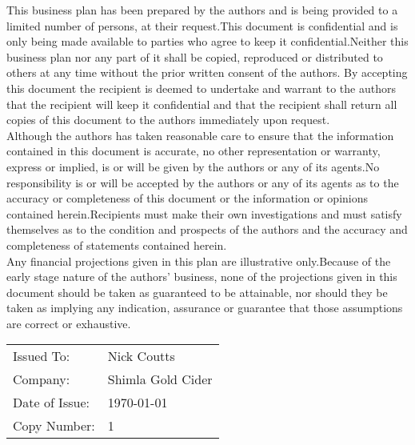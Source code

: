 \documentclass[11pt]{article}
\begin{document}
\noindent This business plan has been prepared by the authors and is being provided to a limited number of
persons, at their request.This document is confidential and is only being made available to
parties who agree to keep it confidential.Neither this business plan nor any part of it shall be
copied, reproduced or distributed to others at any time without the prior written consent of the authors.
By accepting this document the recipient is deemed to undertake and warrant to the authors that the
recipient will keep it confidential and that the recipient shall return all copies of this document
to the authors immediately upon request. \\

\noindent Although the authors has taken reasonable care to ensure that the information contained in this
document is accurate, no other representation or warranty, express or implied, is or will be
given by the authors or any of its agents.No responsibility is or will be accepted by the authors or any of its
agents as to the accuracy or completeness of this document or the information or opinions
contained herein.Recipients must make their own investigations and must satisfy themselves
as to the condition and prospects of the authors and the accuracy and completeness of statements
contained herein. \\

\noindent Any financial projections given in this plan are illustrative only.Because of the early stage
nature of the authors’ business, none of the projections given in this document should be taken as
guaranteed to be attainable, nor should they be taken as implying any indication, assurance
or guarantee that those assumptions are correct or exhaustive.


\begin{table}[H]
\begin{center}
\begin{tabular}{|p{7cm}  p{7cm} |}
\hline
Issued To:      & Nick Coutts         \\
Company:        &  Shimla Gold Cider  \\
Date of Issue:  &  \today            \\
Copy Number:    &  1                  \\
\hline
\end{tabular}
\end{center}
\end{table}

\newpage

\tableofcontents
\end{document}

